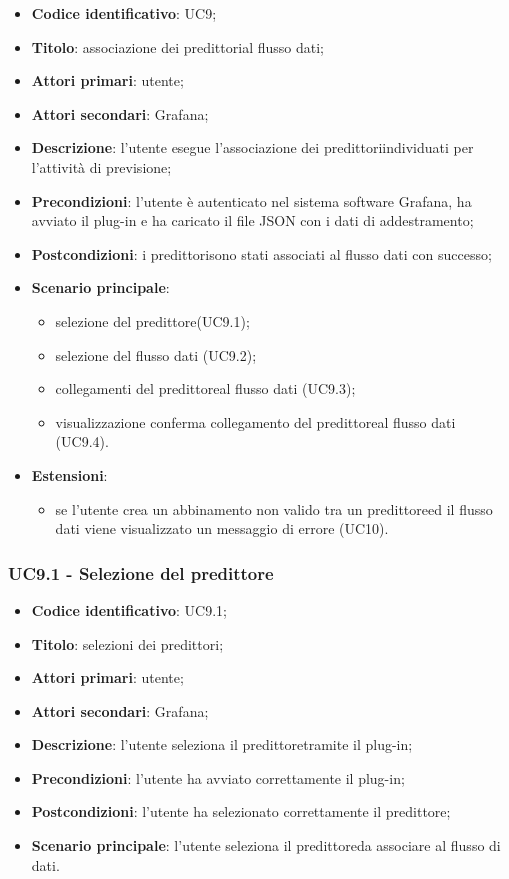 \begin{itemize}
	\item \textbf{Codice identificativo}: UC9;
	\item \textbf{Titolo}: associazione dei predittori\glosp al flusso dati;
	\item \textbf{Attori primari}: utente;
	\item \textbf{Attori secondari}: Grafana\glo;
	\item \textbf{Descrizione}: l'utente esegue l'associazione dei predittori\glosp individuati per l'attività di previsione;
	\item \textbf{Precondizioni}: l'utente è autenticato nel sistema software Grafana\glo, ha avviato il plug-in e ha caricato il file JSON con i dati di addestramento;
	\item \textbf{Postcondizioni}: i predittori\glosp sono stati associati al flusso dati con successo;
	\item \textbf{Scenario principale}: 
		\begin{itemize}
			\item selezione del predittore\glosp (UC9.1);
			\item selezione del flusso dati (UC9.2);
			\item collegamenti del predittore\glosp al flusso dati (UC9.3);
			\item visualizzazione conferma collegamento del predittore\glosp al flusso dati (UC9.4).
		\end{itemize}
	\item \textbf{Estensioni}:
		\begin{itemize}
			\item se l'utente crea un abbinamento non valido tra un predittore\glosp ed il flusso dati viene visualizzato un messaggio di errore (UC10).
		\end{itemize}
\end{itemize}

\subsubsection{UC9.1 - Selezione del predittore}
\begin{itemize}
	\item \textbf{Codice identificativo}: UC9.1;
	\item \textbf{Titolo}: selezioni dei predittori\glo;
	\item \textbf{Attori primari}: utente;
	\item \textbf{Attori secondari}: Grafana\glo;
	\item \textbf{Descrizione}: l'utente seleziona il predittore\glosp tramite il plug-in;
	\item \textbf{Precondizioni}: l'utente ha avviato correttamente il plug-in;
	\item \textbf{Postcondizioni}: l'utente ha selezionato correttamente il predittore\glo;
	\item \textbf{Scenario principale}: l'utente seleziona il predittore\glosp da associare al flusso di dati.
\end{itemize}


